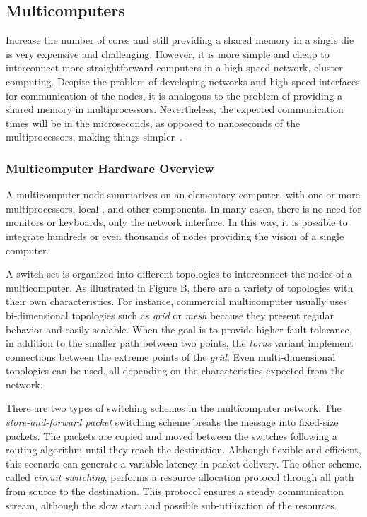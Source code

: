 	\subsection{Multicomputers}

		Increase the number of cores and still providing a shared memory in a
		single die is very expensive and challenging.
		However, it is more simple and cheap to interconnect more straightforward
		computers in a high-speed network, \ie cluster computing.
		Despite the problem of developing networks and high-speed interfaces
		for communication of the nodes, it is analogous to the problem of
		providing a shared memory in multiprocessors.
		Nevertheless, the expected communication times will be in the
		microseconds, as opposed to nanoseconds of the multiprocessors,
		making things simpler~\cite{tanenbaum:4ed}.

			\subsubsection{Multicomputer Hardware Overview}

				A multicomputer node summarizes on an elementary computer, with one or
				more multiprocessors, local \ram, and other components.
				In many cases, there is no need for monitors or keyboards, only the
				network interface.
				In this way, it is possible to integrate hundreds or even thousands
				of nodes providing the vision of a single computer.
				
				A switch set is organized into different topologies to interconnect
				the nodes of a multicomputer.
				As illustrated in Figure B, there are a variety of topologies with
				their own characteristics.
				For instance, commercial multicomputer usually uses bi-dimensional
				topologies such as \textit{grid} or \textit{mesh} because they present
				regular behavior and easily scalable.
				When the goal is to provide higher fault tolerance, in addition to the
				smaller path between two points, the \textit{torus} variant implement
				connections between the extreme points of the \textit{grid}.
				Even multi-dimensional topologies can be used, all depending on the
				characteristics expected from the network.

				There are two types of switching schemes in the multicomputer network.
				The \textit{store-and-forward packet} switching scheme breaks the message
				into fixed-size packets.
				The packets are copied and moved between the switches following a
				routing algorithm until they reach the destination.
				Although flexible and efficient, this scenario can generate a variable
				latency in packet delivery.
				The other scheme, called \textit{circuit switching}, performs a resource
				allocation protocol through all path from source to the destination.
				This protocol ensures a steady communication stream, although the
				slow start and possible sub-utilization of the resources.

